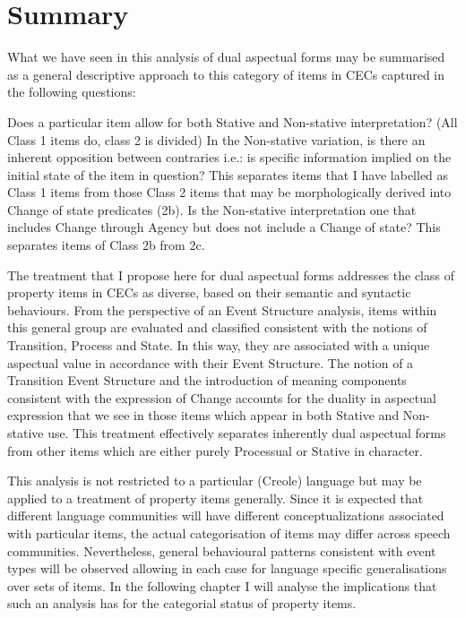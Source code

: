 \section{Summary}\label{sec:5.4}

What we have seen in this analysis of dual aspectual forms may be summarised as a general descriptive approach to this category of items in CECs captured in the following questions:

\ea%
\label{ex:5:29}
 \ea Does a particular item allow for both Stative and Non-stative interpretation? (All Class 1 items do, class 2 is divided)
 \ex In the Non-stative variation, is there an inherent opposition between contraries i.e.: is specific information implied on the initial state of the item in question? This separates items that I have labelled as Class 1 items from those Class 2 items that may be morphologically derived into Change of state predicates (2b). 
 \ex Is the Non-stative interpretation one that includes Change through Agency but does not include a Change of state? This separates items of Class 2b from 2c.
 \z
\z 

The treatment that I propose here for dual aspectual forms addresses the class of property items in CECs as diverse, based on their semantic and syntactic behaviours. From the perspective of an Event Structure analysis, items within this general group are evaluated and classified consistent with the notions of Transition, Process and State. In this way, they are associated with a unique aspectual value in accordance with their Event Structure. The notion of a Transition Event Structure and the introduction of meaning components consistent with the expression of Change accounts for the duality in aspectual expression that we see in those items which appear in both Stative and Non-stative use. This treatment effectively separates inherently dual aspectual forms from other items which are either purely Processual or Stative in character. 

This analysis is not restricted to a particular (Creole) language but may be applied to a treatment of property items generally. Since it is expected that different language communities will have different conceptualizations associated with particular items, the actual categorisation of items may differ across speech communities. Nevertheless, general behavioural patterns consistent with event types will be observed allowing in each case for language specific generalisations over sets of items. In the following chapter I will analyse the implications that such an analysis has for the categorial status of property items.
